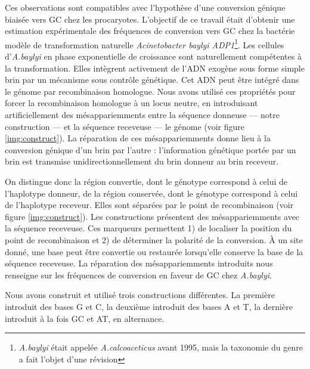 Ces observations sont compatibles avec l'hypothèse d'une conversion génique
biaisée vers GC chez les procaryotes. L'objectif de ce travail était d'obtenir
une estimation expérimentale des fréquences de conversion vers GC chez la
bactérie modèle de transformation naturelle \emph{Acinetobacter baylyi
  ADP1}\footnote{\emph{A.baylyi} était appelée \emph{A.calcoaceticus} avant
  1995, mais la taxonomie du genre a fait l'objet d'une
  révision\cite{euzeby_list_1997}}. Les cellules d'\emph{A.baylyi} en phase
exponentielle de croissance sont naturellement compétentes à la transformation.
Elles intègrent activement de l'ADN exogène sous forme simple brin par un
mécanisme sous contrôle génétique. Cet ADN peut être intégré dans le génome par
recombinaison homologue. Nous avons utilisé ces propriétés pour forcer la
recombinaison homologue à un locus neutre, en introduisant artificiellement des
mésappariemments entre la séquence donneuse --- notre construction --- et la
séquence receveuse --- le génome (voir figure \ref{img:construct}). La
réparation de ces mésappariemments donne lieu à la conversion génique d'un brin
par l'autre : l'information génétique portée par un brin est transmise
unidirectionnellement du brin donneur au brin receveur.

On distingue donc la région convertie, dont le génotype correspond à celui de
l'haplotype donneur, de la région conservée, dont le génotype correspond à celui
de l'haplotype receveur. Elles sont séparées par le point de recombinaison (voir
figure \ref{img:construct}). Les constructions présentent des mésappariemments
avec la séquence receveuse. Ces marqueurs permettent 1) de localiser la position
du point de recombinaison et 2) de déterminer la polarité de la conversion. À un
site donné, une base peut être convertie ou restaurée lorsqu'elle conserve la
base de la séquence receveuse. La réparation des mésappariemments introduits nous renseigne sur les
fréquences de conversion en faveur de GC chez \emph{A.baylyi}.

Nous avons construit et utilisé trois constructions différentes. La première
introduit des bases G et C, la deuxième introduit des bases A et T, la dernière
introduit à la fois GC et AT, en alternance.
